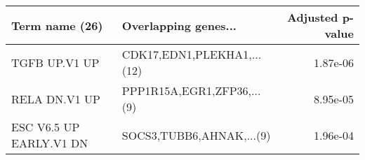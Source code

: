 \begin{tabular}{llr}
\toprule
         Term name (26) &       Overlapping genes... &  Adjusted p-value \\
\midrule
          TGFB UP.V1 UP & CDK17,EDN1,PLEKHA1,...(12) &          1.87e-06 \\
          RELA DN.V1 UP & PPP1R15A,EGR1,ZFP36,...(9) &          8.95e-05 \\
ESC V6.5 UP EARLY.V1 DN &   SOCS3,TUBB6,AHNAK,...(9) &          1.96e-04 \\
\bottomrule
\end{tabular}
